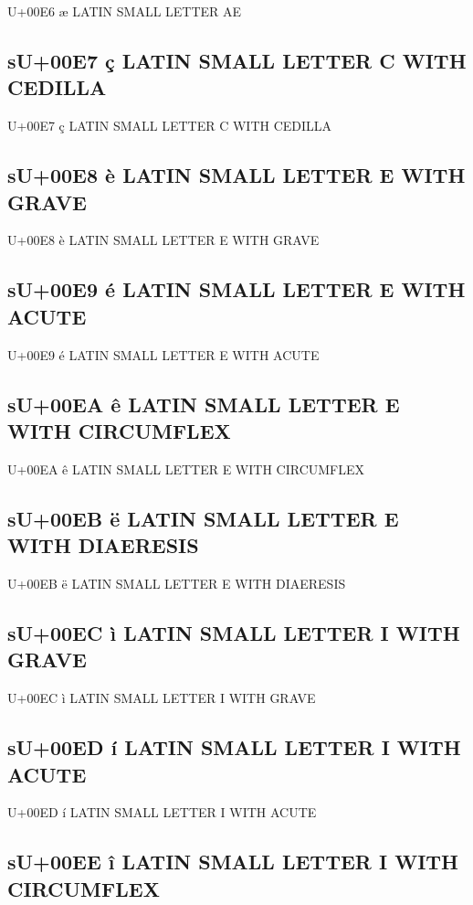 U+00E6 æ  LATIN SMALL LETTER AE

\subsection{sU+00E7 ç  LATIN SMALL LETTER C WITH CEDILLA}

U+00E7 ç  LATIN SMALL LETTER C WITH CEDILLA

\subsection{sU+00E8 è  LATIN SMALL LETTER E WITH GRAVE}

U+00E8 è  LATIN SMALL LETTER E WITH GRAVE

\subsection{sU+00E9 é  LATIN SMALL LETTER E WITH ACUTE}

U+00E9 é  LATIN SMALL LETTER E WITH ACUTE

\subsection{sU+00EA ê  LATIN SMALL LETTER E WITH CIRCUMFLEX}

U+00EA ê  LATIN SMALL LETTER E WITH CIRCUMFLEX

\subsection{sU+00EB ë  LATIN SMALL LETTER E WITH DIAERESIS}

U+00EB ë  LATIN SMALL LETTER E WITH DIAERESIS

\subsection{sU+00EC ì  LATIN SMALL LETTER I WITH GRAVE}

U+00EC ì  LATIN SMALL LETTER I WITH GRAVE

\subsection{sU+00ED í  LATIN SMALL LETTER I WITH ACUTE}

U+00ED í  LATIN SMALL LETTER I WITH ACUTE

\subsection{sU+00EE î  LATIN SMALL LETTER I WITH CIRCUMFLEX}

